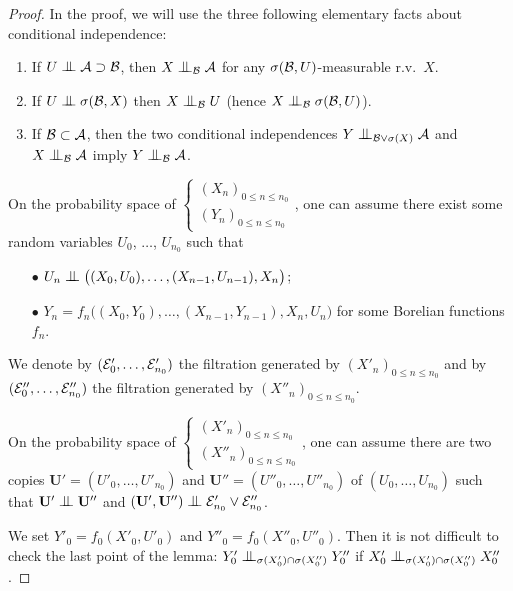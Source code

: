 \documentclass[12pt,a4paper]{article}
\begin{document}
\begin{proof}
In the proof, we will use the three following elementary facts about 
conditional independence:
\begin{enumerate}[{\it(i)}]
\item If $U \indep {\cal A} \supset {\cal B}$, 
then $X \indep_\BB {\cal A}$ for any $\sigma({\cal B}, U)$-measurable r.v.\ $X$.

\item If $U \indep \sigma({\cal B}, X)$ then $X \indep_\BB U$ (hence $X \indep_\BB \sigma({\cal B}, U)$).

\item If $\mathcal{B} \subset {\cal A}$, then 
the two conditional independences $Y \indep_{\BB \vee \sigma(X)} {\cal A}$
and $X \indep_{\BB} {\cal A}$ imply $Y \indep_{\BB} {\cal A}$.
\end{enumerate}

On the probability space of $\left\{\begin{smallmatrix} {(X_n)}_{0 \leq n \leq n_0} \\ 
{(Y_n)}_{0 \leq n \leq n_0}
\end{smallmatrix}\right.$, one can assume there exist some random variables 
$U_0$, $\ldots$, $U_{n_0}$ such that 
\begin{itemize}
\item[$\bullet$] $U_n \indep \bigl((X_0,U_0), \ldots, (X_{n-1}, U_{n-1}), X_n\bigr)$;

\item[$\bullet$] $Y_n = f_n\bigl((X_0,Y_0), \ldots, (X_{n-1}, Y_{n-1}), X_n, U_n\bigr)$   
for some Borelian functions $f_n$. 
\end{itemize}

We denote by $(\mathcal{E}'_0, \ldots, \mathcal{E}'_{n_0})$ the filtration generated by 
${(X'_n)}_{0 \leq n \leq n_0}$ and by $(\mathcal{E}''_0, \ldots, \mathcal{E}''_{n_0})$ 
the filtration generated by ${(X''_n)}_{0 \leq n \leq n_0}$. 

On the probability space of $\left\{\begin{smallmatrix} {(X'_n)}_{0 \leq n \leq n_0} \\ 
{(X''_n)}_{0 \leq n \leq n_0}
\end{smallmatrix}\right.$, one can assume there are two copies 
$\mathbf{U}'=(U'_0, \ldots, U'_{n_0})$ and $\mathbf{U}''=(U''_0, \ldots, U''_{n_0})$ of 
$(U_0, \ldots, U_{n_0})$ such that $\mathbf{U}' \indep \mathbf{U}''$ and 
$(\mathbf{U}',\mathbf{U}'') \indep \EEE'_{n_0} \vee \EEE''_{n_0}$. 

We set $Y'_0 = f_0(X'_0, U'_0)$ and $Y''_0 = f_0(X''_0, U''_0)$. 
Then it is not difficult to check 
the last point of the lemma:  
 $Y'_0 \indep_{\sigma(X'_0)\cap\sigma(X''_0)} Y''_0$
if  $X'_0 \indep_{\sigma(X'_0)\cap\sigma(X''_0)} X''_0$.  



\end{proof}
\end{document}
